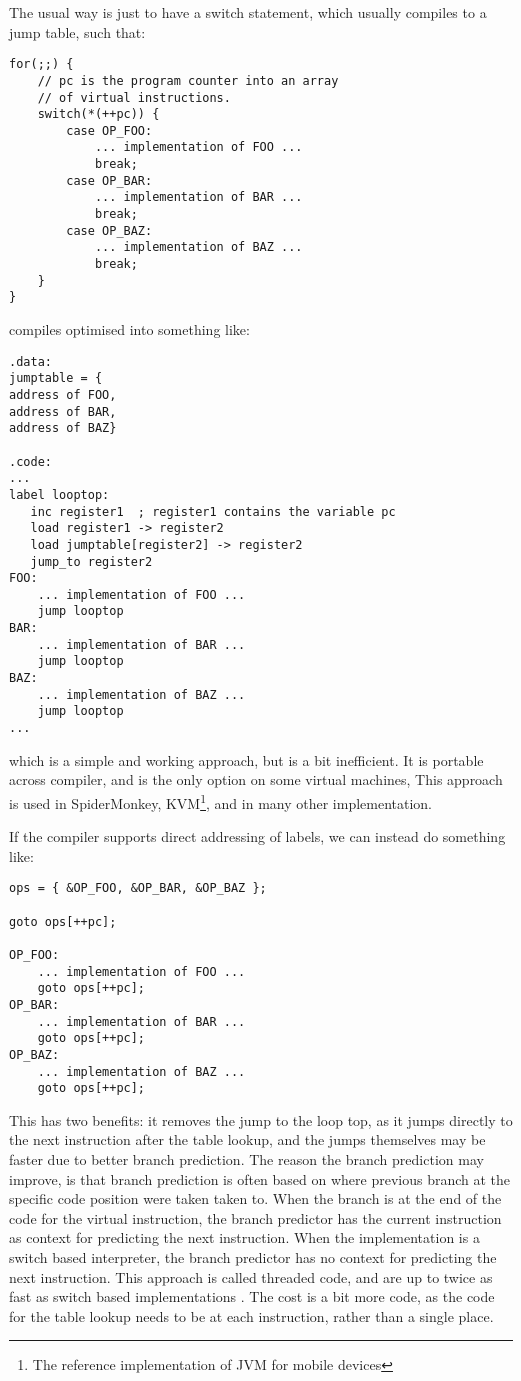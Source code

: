 \documentclass[11pt]{report}
\begin{document}
The usual way is just to have a switch statement, which usually compiles to a jump table, such that:
\begin{verbatim}
for(;;) {
    // pc is the program counter into an array
    // of virtual instructions.
    switch(*(++pc)) { 
        case OP_FOO:
            ... implementation of FOO ...
            break; 
        case OP_BAR:
            ... implementation of BAR ...
            break; 
        case OP_BAZ:
            ... implementation of BAZ ...
            break; 
    }
}
\end{verbatim}
compiles optimised into something like:
\begin{verbatim}
.data:
jumptable = {
address of FOO,
address of BAR,
address of BAZ}

.code:
...
label looptop:
   inc register1  ; register1 contains the variable pc
   load register1 -> register2
   load jumptable[register2] -> register2
   jump_to register2
FOO:
    ... implementation of FOO ...
    jump looptop
BAR:
    ... implementation of BAR ...
    jump looptop
BAZ:
    ... implementation of BAZ ...
    jump looptop
...
\end{verbatim}
which is a simple and working approach, but is a bit inefficient. It is portable across compiler, and is the only option on some virtual machines,
This approach is used in SpiderMonkey, KVM\footnote{The reference implementation of JVM for mobile devices}, and in many other implementation.

If the compiler supports direct addressing of labels, we can instead do something like:
\begin{verbatim}
ops = { &OP_FOO, &OP_BAR, &OP_BAZ };
   
goto ops[++pc];

OP_FOO:
    ... implementation of FOO ...
    goto ops[++pc];
OP_BAR:
    ... implementation of BAR ...
    goto ops[++pc];
OP_BAZ:
    ... implementation of BAZ ...
    goto ops[++pc];
\end{verbatim}
This has two benefits: it removes the jump to the loop top, as it jumps directly to the next instruction after the table lookup, and the jumps themselves may be faster due to better branch prediction.
The reason the branch prediction may improve, is that branch prediction is often based on where previous branch at the specific code position were taken taken to. 
When the branch is at the end of the code for the virtual instruction,
the branch predictor has the current instruction as context for predicting the next instruction.
When the implementation is a switch based interpreter, the branch predictor has no context for predicting the next instruction.
This approach is called threaded code, and are up to twice as fast as switch based implementations \cite{ertl-efficient-2003}.
The cost is a bit more code, as the code for the table lookup needs to be at each instruction, rather than a single place. 
\end{document}
